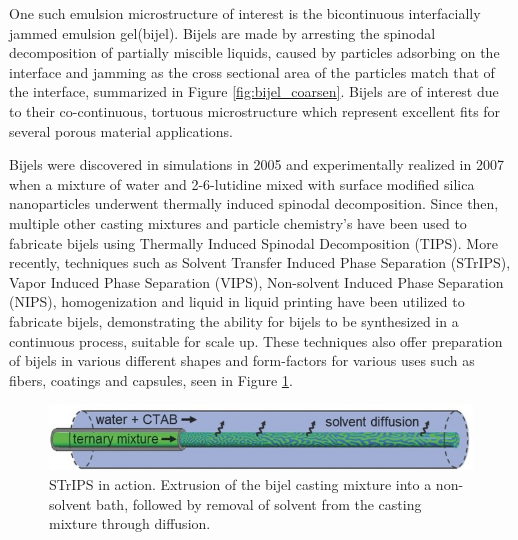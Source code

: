 One such emulsion microstructure of interest is the bicontinuous interfacially jammed emulsion gel(bijel). \cite{stratford_colloidal_2005, herzig_bicontinuous_2007, lee_bicontinuous_2010} Bijels are made by arresting the spinodal decomposition of partially miscible liquids, caused by particles adsorbing on the interface and jamming as the cross sectional area of the particles match that of the interface, summarized in Figure \ref{fig:bijel_coarsen}. Bijels are of interest due to their co-continuous, tortuous microstructure which represent excellent fits for several porous material applications.

Bijels were discovered in simulations in 2005 and experimentally realized in 2007 when a mixture of water and 2-6-lutidine mixed with surface modified silica nanoparticles underwent thermally induced spinodal decomposition. \cite{stratford_colloidal_2005, herzig_bicontinuous_2007} Since then, multiple other casting mixtures and particle chemistry's have been used to fabricate bijels using Thermally Induced Spinodal Decomposition (TIPS). \cite{lee_bicontinuous_2010, bai_dynamics_2015} More recently, techniques such as Solvent Transfer Induced Phase Separation (STrIPS), Vapor Induced Phase Separation (VIPS), Non-solvent Induced Phase Separation (NIPS), homogenization and liquid in liquid printing have been utilized to fabricate bijels, demonstrating the ability for bijels to be synthesized in a continuous process, suitable for scale up. \cite{haase_continuous_2015, wang_scalable_2020, cai_bijels_2017, yabuno_preparation_2020, wang_bicontinuous_2023, amirfattahi_fabrication_2024} These techniques also offer preparation of bijels in various different shapes and form-factors for various uses such as fibers, coatings and capsules, seen in Figure \ref{fig:strips}. \cite{haase_continuous_2015, boakye-ansah_controlling_2020, kharal_hightensile_2020, wang_bicontinuous_2023}

\begin{figure}[h]
    \centering
    \includegraphics[scale = 2]{figures/literature_review/STRIPPS.jpg}
    \caption{STrIPS in action. Extrusion of the bijel casting mixture into a non-solvent bath, followed by removal of solvent from the casting mixture through diffusion. \cite{haase_continuous_2015}}
    \label{fig:strips}
\end{figure}

